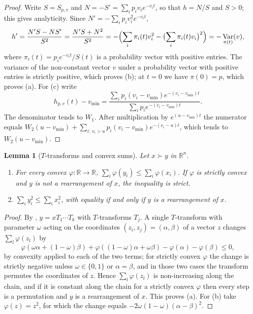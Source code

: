 \documentclass[10pt]{article}
\theoremstyle{plain}
\newtheorem{lemma}[theorem]{Lemma}
\theoremstyle{definition}
\theoremstyle{remark}
\newcommand{\R}{\mathbb{R}}
\DeclareMathOperator{\Var}{Var}
\begin{document}
\begin{proof}
Write $S=S_{p,v}$ and $N=-S'=\sum_i p_i v_i e^{-v_i t}$, so that $h=N/S$ and $S>0$; this gives analyticity. Since $N'=-\sum_i p_i v_i^2 e^{-v_i t}$,
\[
h'=\frac{N'S-NS'}{S^2}=\frac{N'S+N^2}{S^2}
=-\Bigl(\sum_i \pi_i(t)v_i^2-\bigl(\sum_i \pi_i(t)v_i\bigr)^2\Bigr)
=-\Var_{\pi(t)}(v),
\]
where $\pi_i(t)=p_ie^{-v_it}/S(t)$ is a probability vector with positive entries. The variance of the non-constant vector $v$ under a probability vector with positive entries is strictly positive, which proves (b); at $t=0$ we have $\pi(0)=p$, which proves (a). For (c) write
\[
h_{p,v}(t)-v_{\min}=\frac{\sum_i p_i(v_i-v_{\min})e^{-(v_i-v_{\min})t}}{\sum_i p_i e^{-(v_i-v_{\min})t}} .
\]
The denominator tends to $W_1$. After multiplication by $e^{(u-v_{\min})t}$ the numerator equals $W_2(u-v_{\min})+\sum_{i:\,v_i>u}p_i(v_i-v_{\min})e^{-(v_i-u)t}$, which tends to $W_2(u-v_{\min})$.
\end{proof}

\begin{lemma}[$T$-transforms and convex sums]\label{lem:schur}
Let $x\succ y$ in $\R^n$.
\begin{enumerate}
\item[(a)] For every convex $\varphi:\R\to\R$, $\sum_i\varphi(y_i)\le\sum_i\varphi(x_i)$. If $\varphi$ is strictly convex and $y$ is not a rearrangement of $x$, the inequality is strict.
\item[(b)] $\sum_i y_i^2\le\sum_i x_i^2$, with equality if and only if $y$ is a rearrangement of $x$.
\end{enumerate}
\end{lemma}

\begin{proof}
By \cite[Lemma~2.B.1]{MarshallOlkinArnold2011}, $y=xT_1\cdots T_k$ with $T$-transforms $T_j$. A single $T$-transform with parameter $\omega$ acting on the coordinates $(z_i,z_j)=(\alpha,\beta)$ of a vector $z$ changes $\sum_l\varphi(z_l)$ by
\[
\varphi(\omega\alpha+(1-\omega)\beta)+\varphi((1-\omega)\alpha+\omega\beta)-\varphi(\alpha)-\varphi(\beta)\le 0,
\]
by convexity applied to each of the two terms; for strictly convex $\varphi$ the change is strictly negative unless $\omega\in\{0,1\}$ or $\alpha=\beta$, and in those two cases the transform permutes the coordinates of $z$. Hence $\sum_l\varphi(z_l)$ is non-increasing along the chain, and if it is constant along the chain for a strictly convex $\varphi$ then every step is a permutation and $y$ is a rearrangement of $x$. This proves (a). For (b) take $\varphi(z)=z^2$, for which the change equals $-2\omega(1-\omega)(\alpha-\beta)^2$.
\end{proof}
\end{document}
